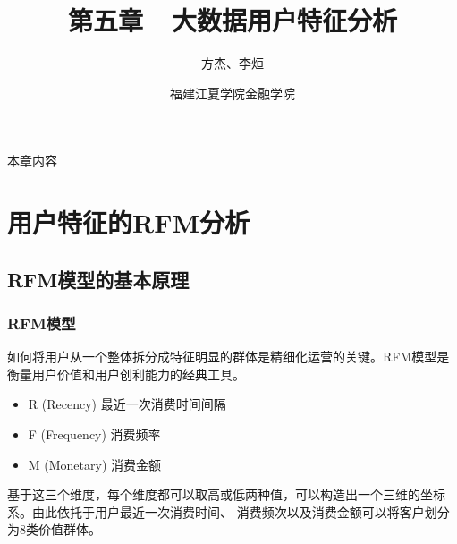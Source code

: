 \documentclass[t]{beamer}
\begin{document}
\fontsize{11}{18}\selectfont


\CTEXindent



  \title{第五章~~大数据用户特征分析}
\author{方杰、李烜}
\date{福建江夏学院金融学院}
  \begin{frame}
    \maketitle
  \end{frame}

\begin{frame}{本章内容}
    \tableofcontents
\end{frame}

\section{用户特征的RFM分析}
\subsection{RFM模型的基本原理}
\begin{frame}
    \frametitle{RFM模型}
    如何将用户从一个整体拆分成特征明显的群体是精细化运营的关键。RFM模型是 衡量用户价值和用户创利能力的经典工具。
\begin{itemize}
  \item R (Recency) 最近一次消费时间间隔
  \item  F (Frequency) 消费频率
  \item  M (Monetary) 消费金额
\end{itemize}

基于这三个维度，每个维度都可以取高或低两种值，可以构造出一个三维的坐标系。由此依托于用户最近一次消费时间、 消费频次以及消费金额可以将客户划分为8类价值群体。


\end{frame}
\end{document}

